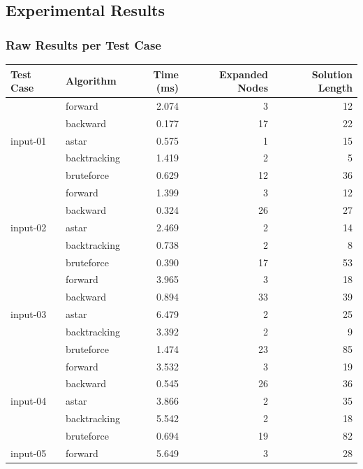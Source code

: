\documentclass[12pt,a4paper]{article}
\begin{document}
\subsection{Experimental Results}
\subsubsection{Raw Results per Test Case}
\begin{table}[H]
\centering
\scriptsize
\renewcommand{\arraystretch}{1.15}
\begin{tabular}{|l|l|r|r|r|}
\hline
\textbf{Test Case} & \textbf{Algorithm} & \textbf{Time (ms)} & \textbf{Expanded Nodes} & \textbf{Solution Length} \\
\hline
\multirow{5}{*}{input-01}
& forward      & 2.074    & 3      & 12 \\
& backward     & 0.177    & 17     & 22 \\
& astar        & 0.575    & 1      & 15 \\
& backtracking & 1.419    & 2      & 5  \\
& bruteforce   & 0.629    & 12     & 36 \\
\hline
\multirow{5}{*}{input-02}
& forward      & 1.399    & 3      & 12 \\
& backward     & 0.324    & 26     & 27 \\
& astar        & 2.469    & 2      & 14 \\
& backtracking & 0.738    & 2      & 8  \\
& bruteforce   & 0.390    & 17     & 53 \\
\hline
\multirow{5}{*}{input-03}
& forward      & 3.965    & 3      & 18 \\
& backward     & 0.894    & 33     & 39 \\
& astar        & 6.479    & 2      & 25 \\
& backtracking & 3.392    & 2      & 9  \\
& bruteforce   & 1.474    & 23     & 85 \\
\hline
\multirow{5}{*}{input-04}
& forward      & 3.532    & 3      & 19 \\
& backward     & 0.545    & 26     & 36 \\
& astar        & 3.866    & 2      & 35 \\
& backtracking & 5.542    & 2      & 18 \\
& bruteforce   & 0.694    & 19     & 82 \\
\hline
\multirow{5}{*}{input-05}
& forward      & 5.649    & 3      & 28 \\

\end{tabular}
\end{table}
\end{document}
